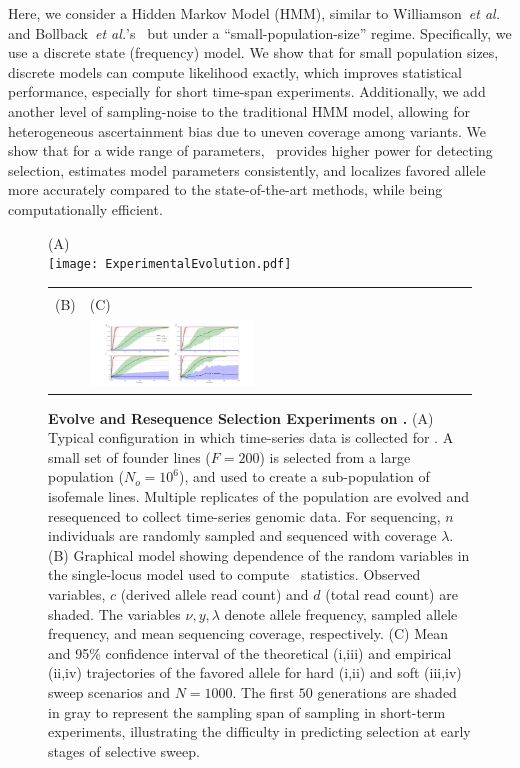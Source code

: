 Here, we consider a Hidden Markov Model (HMM), similar to
Williamson~\emph{et al.}~\cite{williamson1999using} and
Bollback~\emph{et al.}'s~\cite{bollback2008estimation} but under a
``small-population-size'' regime. Specifically, we use a discrete
state (frequency) model.  We show that for small population sizes,
discrete models can compute likelihood exactly, which improves
statistical performance, especially for short time-span
experiments. Additionally, we add another level of sampling-noise to
the traditional HMM model, allowing for heterogeneous ascertainment
bias due to uneven coverage among variants. We show that for a wide
range of parameters, \comale\ provides higher power for detecting
selection, estimates model parameters consistently, and localizes
favored allele more accurately compared to the state-of-the-art
methods, while being computationally efficient.

\begin{figure}
	\centering
	(A)\\
	\texttt{[image: ExperimentalEvolution.pdf]}\\
	
	\begin{tabular}{l|l}
		\hline\\
		(B) &(C)\\
		\raisebox{0.1in}{
			\texttt{[image: HMMGM.pdf]}}
		& 	\includegraphics[trim=0in 0.in 0in 
		0.0in,clip,width=0.44\textwidth]{AF.pdf}	
		
	\end{tabular}
	\hspace{-1in}
	\caption{{\bf Evolve and Resequence Selection Experiments on \dmel.}
		(A) Typical configuration in which time-series data is 
		collected for
		\dmel. A small set of founder lines ($F=200$) is selected from a
		large population ($N_o=10^{6}$), and used to create a 
		sub-population
		of isofemale lines. Multiple replicates of the population are
		evolved and resequenced to collect time-series genomic data. For
		sequencing, $n$ individuals are randomly sampled and sequenced 
		with
		coverage $\lambda$.  (B) Graphical model showing dependence of 
		the
		random variables in the single-locus model used to compute 
		\comale\
		statistics. Observed variables, $c$ (derived allele read count) 
		and
		$d$ (total read count) are shaded. The variables $\nu,y,\lambda$
		denote allele frequency, sampled allele frequency, and mean
		sequencing coverage, respectively. (C) Mean and 95\% confidence
		interval of the theoretical (i,iii) and empirical (ii,iv)
		trajectories of the favored allele for hard (i,ii) and soft 
		(iii,iv)
		sweep scenarios and $N=1000$.  The first $50$ generations are 
		shaded
		in gray to represent the sampling span of sampling in short-term
		experiments, illustrating the difficulty in predicting 
		selection at
		early stages of selective sweep.  }
	\label{fig:1}
\end{figure}
